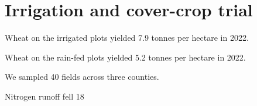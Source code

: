 \section{Irrigation and cover-crop trial}
Wheat on the irrigated plots yielded 7.9 tonnes per hectare in 2022.

Wheat on the rain-fed plots yielded 5.2 tonnes per hectare in 2022.

We sampled 40 fields across three counties.

Nitrogen runoff fell 18%
